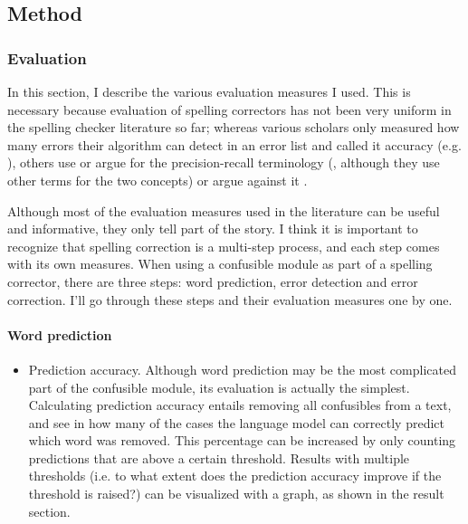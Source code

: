 \documentclass[12pt]{article}
\begin{document}
\subsection{Method}


\subsubsection{Evaluation}

In this section, I describe the various evaluation measures I used. This is necessary because evaluation of spelling correctors has not been very uniform in the spelling checker literature so far; whereas various scholars only measured how many errors their algorithm can detect in an error list and called it accuracy (e.g. \citealp{agirre98, bm00, tm02,vandelden04}), others use or argue for the precision-recall terminology (\citealp{reynaert08,pz84}, although they use other terms for the two concepts) or argue against it \citep{sp02}.\\\indent

Although most of the evaluation measures used in the literature can be useful and informative, they only tell part of the story. I think it is important to recognize that spelling correction is a multi-step process, and each step comes with its own measures. When using a confusible module as part of a spelling corrector, there are three steps: word prediction, error detection and error correction. I'll go through these steps and their evaluation measures one by one.

\paragraph{Word prediction}

\begin{itemize}
\item Prediction accuracy. Although word prediction may be the most complicated part of the confusible module, its evaluation is actually the simplest. Calculating prediction accuracy entails removing all confusibles from a text, and see in how many of the cases the language model can correctly predict which word was removed. This percentage can be increased by only counting predictions that are above a certain threshold. Results with multiple thresholds (i.e. to what extent does the prediction accuracy improve if the threshold is raised?) can be visualized with a graph, as shown in the result section.
\end{itemize}
\end{document}

